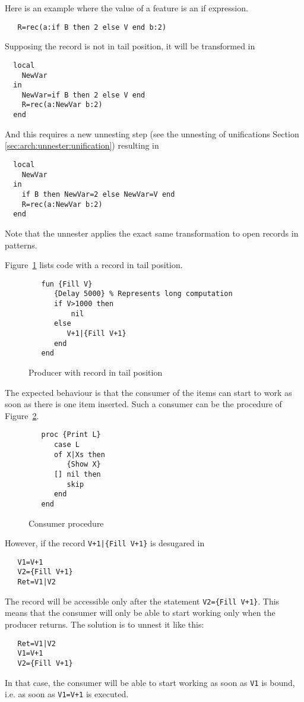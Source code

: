 \documentclass[a4paper]{memoir}
\begin{document}
Here is an example where the value of a feature is an if expression.
\begin{lstlisting}
   R=rec(a:if B then 2 else V end b:2)
\end{lstlisting}
Supposing the record is not in tail position, it will be transformed in
\begin{lstlisting}
  local
    NewVar
  in
    NewVar=if B then 2 else V end
    R=rec(a:NewVar b:2)
  end
\end{lstlisting}
And this requires a new unnesting step (see the unnesting of unifications Section \ref{sec:arch:unnester:unification}) resulting in 
\begin{lstlisting}
  local
    NewVar
  in
    if B then NewVar=2 else NewVar=V end
    R=rec(a:NewVar b:2)
  end
\end{lstlisting}

Note that the unnester applies the exact same transformation to open records in
patterns.



Figure~\ref{fig:unnester:fill_tail} lists code with a record in tail position.

\begin{figure}[h]
\begin{lstlisting}
   fun {Fill V}
      {Delay 5000} % Represents long computation
      if V>1000 then
	      nil
      else
         V+1|{Fill V+1}
      end
   end
\end{lstlisting}
\caption{Producer with record in tail position}
\label{fig:unnester:fill_tail}
\end{figure}


The expected behaviour is that the consumer of the items can start to work as
soon as there is one item inserted. Such a consumer can be the procedure of
Figure~\ref{fig:unnester:consumer}.
\begin{figure}[h]
\begin{lstlisting}
   proc {Print L}
      case L
      of X|Xs then
         {Show X}
      [] nil then
         skip
      end
   end
\end{lstlisting}
\caption{Consumer procedure}
\label{fig:unnester:consumer}
\end{figure}


However, if the record \lstinline!V+1|{Fill V+1}! is desugared in 
\begin{lstlisting}
   V1=V+1
   V2={Fill V+1}
   Ret=V1|V2
\end{lstlisting}
The record will be accessible only after the statement 
\lstinline!V2={Fill V+1}!. This means that the consumer will only be able to
start working only when the producer returns.
The solution is to unnest it like this:
\begin{lstlisting}
   Ret=V1|V2
   V1=V+1
   V2={Fill V+1}
\end{lstlisting}
In that case, the consumer will be able to start working as soon as
\lstinline!V1! is bound, i.e. as soon as \lstinline!V1=V+1! is executed.
\end{document}
